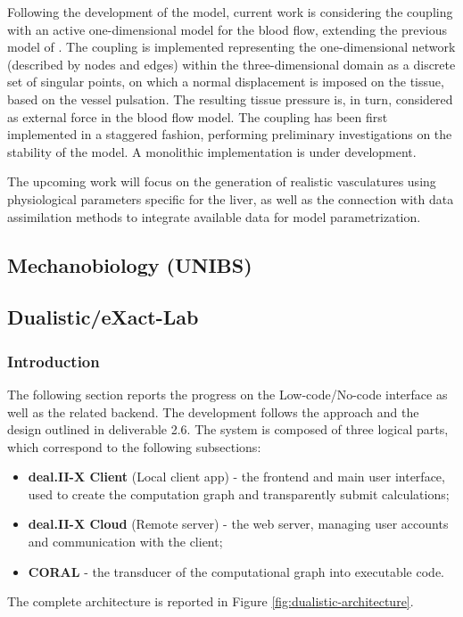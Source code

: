 \documentclass[a4paper,12pt]{article}
\begin{document}
Following the development of the model, current work is considering the coupling with an active one-dimensional model for the blood flow, extending the previous model of \cite{heltai2021multiscale}. The coupling is implemented representing the one-dimensional network (described by nodes and edges) within the three-dimensional domain as a discrete set of singular points, on which a normal displacement is imposed on the tissue, based on the vessel pulsation. The resulting tissue pressure is, in turn, considered as external force in the blood flow model. The coupling has been first implemented in a staggered fashion, performing preliminary investigations on the stability of the model. A monolithic implementation is under development.

The upcoming work will focus on the generation of realistic vasculatures using physiological parameters specific for the liver, as well as the connection with data assimilation methods to integrate available data for model parametrization.

\subsection{Mechanobiology (UNIBS)}

\subsection{Dualistic/eXact-Lab}

\subsubsection{Introduction}
The following section reports the progress on the Low-code/No-code interface as well as the related backend. The development follows the approach and the design outlined in deliverable 2.6. The system is composed of three logical parts, which correspond to the following subsections:
\begin{itemize}
  \item \textbf{deal.II-X Client} (Local client app) - the frontend and main user interface, used to create the computation graph and transparently submit calculations;
  \item \textbf{deal.II-X Cloud} (Remote server) - the web server, managing user accounts and communication with the client;
  \item \textbf{CORAL} - the transducer of the computational graph into executable code.
\end{itemize}
The complete architecture is reported in Figure \ref{fig:dualistic-architecture}.
\end{document}

